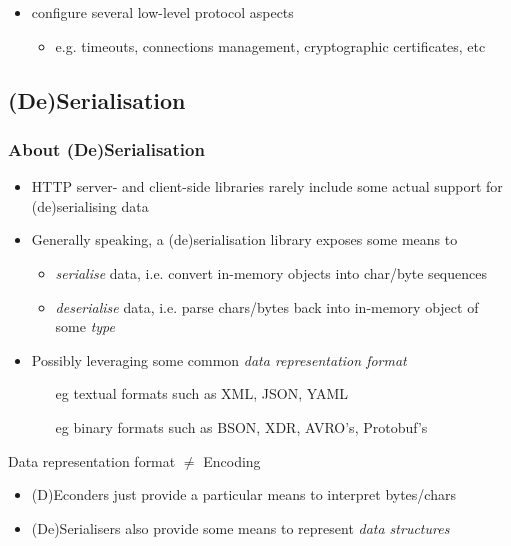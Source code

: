 \documentclass[presentation]{beamer}\mode<presentation>{\usetheme{AMSCesenaPurpleAndGold}}
\begin{document}
\begin{frame}
\begin{itemize}
        \vfill

        \item configure several low-level protocol aspects
        \begin{itemize}
            \item e.g. timeouts, connections management, cryptographic certificates, etc
        \end{itemize} 
    \end{itemize}
\end{frame}

\subsection{(De)Serialisation}

\begin{frame}%
\frametitle{About (De)Serialisation}

    \begin{itemize}
        \item HTTP server- and client-side libraries rarely include some actual support for (de)serialising data 
        
        \vfill

        \item Generally speaking, a (de)serialisation library exposes some means to 
        \begin{itemize}
            \item \emph{serialise} data, i.e. convert  in-memory objects into char/byte sequences

            \item \emph{deserialise} data, i.e. parse chars/bytes back into in-memory object of some \emph{type}
        \end{itemize}

        \vfill

        \item Possibly leveraging some common \emph{data representation format}
        \begin{itemize}
            \item[eg] textual formats such as XML, JSON, YAML
            \item[eg] binary formats such as BSON, XDR, AVRO's, Protobuf's
        \end{itemize}
    \end{itemize}

    \vfill

    \begin{block}{Data representation format $\neq$ Encoding}\small
        \begin{itemize}
            \item (D)Econders just provide a particular means to interpret bytes/chars
            \item (De)Serialisers also provide some means to represent \emph{data structures}
            

\end{itemize}
\end{block}
\end{frame}
\end{document}
